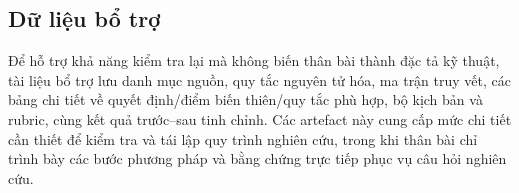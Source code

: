 \subsection{Dữ liệu bổ trợ}
\label{subsec:supplement}

Để hỗ trợ khả năng kiểm tra lại mà không biến thân bài thành đặc tả kỹ thuật, tài liệu bổ trợ lưu danh mục nguồn, quy tắc nguyên tử hóa, ma trận truy vết, các bảng chi tiết về quyết định/điểm biến thiên/quy tắc phù hợp, bộ kịch bản và rubric, cùng kết quả trước--sau tinh chỉnh. Các artefact này cung cấp mức chi tiết cần thiết để kiểm tra và tái lập quy trình nghiên cứu, trong khi thân bài chỉ trình bày các bước phương pháp và bằng chứng trực tiếp phục vụ câu hỏi nghiên cứu.
